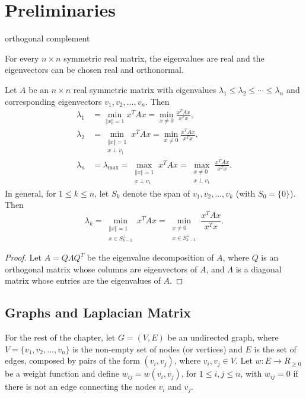 %
%
\let\textcircled=\pgftextcircled
\chapter{Preliminaries}
\label{Chapter2}

\begin{definition}
orthogonal complement
\end{definition}

\begin{theorem}
	For every $n\times n$ symmetric real matrix, the eigenvalues are real and the eigenvectors can be chosen real and orthonormal.
\end{theorem}

\begin{theorem}
Let $A$ be an $n\times n$ real symmetric matrix with eigenvalues $\lambda_1 \leq \lambda_2 \leq \cdots \leq \lambda_n$ and corresponding eigenvectors $v_1, v_2,..., v_n$. Then 
\begin{align*}
	\lambda_1 &= \min_{\left \Vert x\right\Vert = 1} x^TAx = \min_{ x \neq 0} \frac{x^TAx}{x^Tx}, \\
	\lambda_2 &= \min_{\substack{\left \Vert x\right\Vert = 1 \\ x\perp v_1}} x^TAx = \min_{ x \neq 0} \frac{x^TAx}{x^Tx}, \\
	\lambda_n &= \lambda_{\text{max}} = \max_{\substack{\left \Vert x\right\Vert = 1 \\ x\perp v_1}} x^TAx = \max_{\substack{ x \neq 0 \\ x\perp v_1}} \frac{x^TAx}{x^Tx}.
\end{align*}
In general, for $1\leq k \leq n$, let $S_k$ denote the span of $v_1, v_2,..., v_k$ (with $S_0=\{0\}$). Then 
\begin{displaymath}
	\lambda_k = \min_{\substack{\left \Vert x\right\Vert = 1 \\ x\in S_{k-1}^\perp}} x^TAx = \min_{\substack{x \neq 0 \\ x\in S_{k-1}^\perp}} \frac{x^TAx}{x^Tx}.
\end{displaymath}
\end{theorem}
\begin{proof}
	Let $A=Q\Lambda Q^T$ be the eigenvalue decomposition of $A$, where $Q$ is an orthogonal matrix whose columns are eigenvectors of $A$, and $\Lambda$ is a diagonal matrix whose entries are the eigenvalues of $A$.
\end{proof}

\section{Graphs and Laplacian Matrix}
For the rest of the chapter, let $G=(V,E)$ be an undirected graph, where $V=\{v_1, v_2, ... , v_n\}$ is the non-empty set of nodes (or vertices) and $E$ is the set of edges, composed by pairs of the form $(v_i, v_j)$, where $v_i, v_j \in V$. Let $w:E\rightarrow R_{\geq0}$ be a weight function and define $w_{ij}=w(v_i,v_j)$, for $1\leq i,j\leq n$, with $w_{ij} = 0$ if there is not an edge connecting the nodes $v_i$ and $v_j$.

